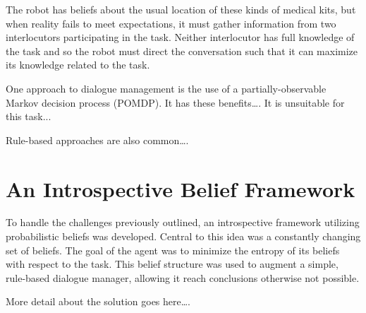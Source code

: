 \documentclass[12pt]{article}
\begin{document}
The robot has beliefs about the usual location of these kinds of
medical kits, but when reality fails to meet expectations, it must
gather information from two interlocutors participating in the
task. Neither interlocutor has full knowledge of the task and so the
robot must direct the conversation such that it can maximize its
knowledge related to the task.

One approach to dialogue management is the use of a
partially-observable Markov decision process (POMDP). It has these
benefits\dots. It is unsuitable for this task...

Rule-based approaches are also common\dots.

\section{An Introspective Belief Framework}
\label{sec:framework}

To handle the challenges previously outlined, an introspective
framework utilizing probabilistic beliefs was developed. Central to
this idea was a constantly changing set of beliefs. The goal of the
agent was to minimize the entropy of its beliefs with respect to the
task. This belief structure was used to augment a simple, rule-based
dialogue manager, allowing it reach conclusions otherwise not
possible.

More detail about the solution goes here\dots.

\end{document}
